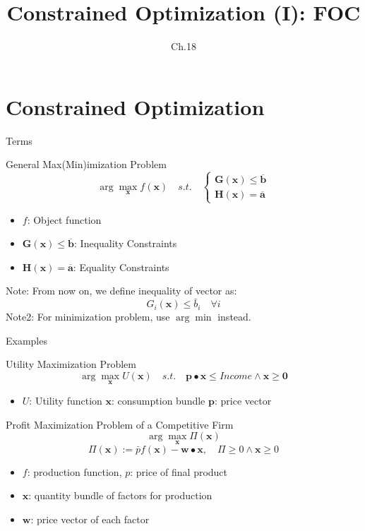 \documentclass[a4paper,11pt]{article}
\author[조남운]{\mail}
\title{Constrained Optimization (I): FOC}
\subtitle{Ch.18}
\newcommand{\bd}{\mathbf}
\begin{document}
	
\maketitle


\section{Constrained Optimization} %
\label{sec:constrained_optimization}
\begin{frame}[t]{Terms}
	\begin{block}
		{General Max(Min)imization Problem}
		\[
			\arg\max_{\bd{x}} f(\bd{x})\quad s.t.\quad \begin{cases}
				\bd{G}(\bd{x})\le\overline{\bd{b}}\\
				\bd{H}(\bd{x})=\overline{\bd{a}}
			\end{cases}
		\]
		\begin{itemize}
			\item $f$: Object function
			\item $\bd{G}(\bd{x})\le\overline{\bd{b}}$: Inequality Constraints
			\item $\bd{H}(\bd{x})=\overline{\bd{a}}$: Equality Constraints
		\end{itemize}
	\end{block}
	Note: From now on, we define inequality of vector as:\[
		G_i(\bd{x}) \le \bar{b}_i\quad \forall i
	\]
	Note2: For minimization problem, use $\arg\min$ instead.
\end{frame}
\begin{frame}[t]{Examples}
	\begin{block}
		{Utility Maximization Problem}
		\[
			\arg\max_{\bd{x}} U(\bd{x})\quad s.t. \quad \bd{p}\bullet \bd{x} \le Income \land \bd{x}\ge \bd{0}
		\]
		\begin{itemize}
			\item $U$: Utility function $\bd{x}$: consumption bundle $\bd{p}$: price vector
		\end{itemize}
	\end{block}
	\begin{block}
		{Profit Maximization Problem of a Competitive Firm}
		\[
			\arg\max_{\bd{x}} \Pi(\bd{x})
		\]\[
			\Pi(\bd{x}) := \bar p f(\bd{x}) - \bd{w}\bullet\bd{x},\quad \Pi\ge 0 \land \bd{x}\ge 0
		\]
		\begin{itemize}
			\item $f$: production function, $p$: price of final product
			\item $\bd{x}$: quantity bundle of factors for production
			\item $\bd{w}$: price vector of each factor
		\end{itemize}
	\end{block}
\end{frame}
\end{document}
